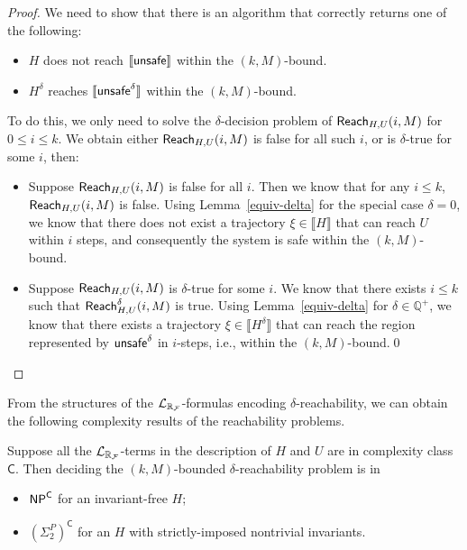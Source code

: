 \documentclass[10pt,envcountsect]{llncs}
\begin{document}
\begin{proof}
We need to show that there is an algorithm that correctly returns one of the following:
\begin{itemize}
\item $H$ does not reach $\llbracket\mathsf{unsafe}\rrbracket$ within the $(k,M)$-bound.
\item $H^{\delta}$ reaches $\llbracket\mathsf{unsafe}^{\delta}\rrbracket$ within the $(k,M)$-bound.
\end{itemize}
To do this, we only need to solve the $\delta$-decision problem of $\mathsf{Reach}_{H,U}(i,M)$ for $0\leq i\leq k$. We obtain either $\mathsf{Reach}_{H,U}(i,M)$ is false for all such $i$, or is $\delta$-true for some $i$, then:
\begin{itemize}
\item Suppose $\mathsf{Reach}_{H,U}(i,M)$ is false for all $i$. Then we know that for any $i\leq k$, $\mathsf{Reach}_{H,U}(i,M)$ is false. Using Lemma~\ref{equiv-delta} for the special case $\delta=0$, we know that there does not exist a trajectory $\xi\in\llbracket H\rrbracket$ that can reach $U$ within $i$ steps, and consequently the system is safe within the $(k,M)$-bound.
\item Suppose $\mathsf{Reach}_{H,U}(i,M)$ is $\delta$-true for some $i$. We know that there exists $i\leq k$ such that $\mathsf{Reach}^{\delta}_{H,U}(i,M)$ is true. Using Lemma~\ref{equiv-delta} for $\delta\in\mathbb{Q}^+$, we know that there exists a trajectory $\xi\in\llbracket H^{\delta}\rrbracket$ that can reach the region represented by $\mathsf{unsafe}^{\delta}$ in $i$-steps, i.e., within the $(k,M)$-bound.\qed
\end{itemize}
\end{proof}
From the structures of the $\mathcal{L}_{\mathbb{R}_{\mathcal{F}}}$-formulas encoding $\delta$-reachability, we can obtain the following complexity results of the reachability problems.
\begin{theorem}[Complexity]
Suppose all the $\mathcal{L}_{\mathbb{R}_{\mathcal{F}}}$-terms in the description of $H$ and $U$ are in complexity class $\mathsf{C}$. Then deciding the $(k,M)$-bounded $\delta$-reachability problem is in
\begin{itemize}
\item $\mathsf{NP}^{\mathsf{C}}$ for an invariant-free $H$;
\item $(\Sigma_2^P)^{\mathsf{C}}$ for an $H$ with strictly-imposed nontrivial invariants.
\end{itemize}
\end{theorem}
\end{document}
